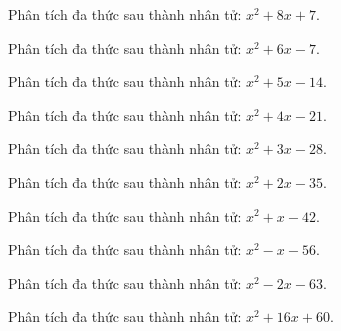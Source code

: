 \begin{bt}
	Phân tích đa thức sau thành nhân tử: $x^2 + 8 x + 7$.
\end{bt}
\begin{bt}
	Phân tích đa thức sau thành nhân tử: $x^2 + 6 x - 7$.
\end{bt}
\begin{bt}
	Phân tích đa thức sau thành nhân tử: $x^2 + 5 x - 14$.
\end{bt}
\begin{bt}
	Phân tích đa thức sau thành nhân tử: $x^2 + 4 x - 21$.
\end{bt}
\begin{bt}
	Phân tích đa thức sau thành nhân tử: $x^2 + 3 x - 28$.
\end{bt}
\begin{bt}
	Phân tích đa thức sau thành nhân tử: $x^2 + 2 x - 35$.
\end{bt}
\begin{bt}
	Phân tích đa thức sau thành nhân tử: $x^2 + x - 42$.
\end{bt}
\begin{bt}
	Phân tích đa thức sau thành nhân tử: $x^2 - x - 56$.
\end{bt}
\begin{bt}
	Phân tích đa thức sau thành nhân tử: $x^2 - 2 x - 63$.
\end{bt}
\begin{bt}
	Phân tích đa thức sau thành nhân tử: $x^2 + 16 x + 60$.
\end{bt}
